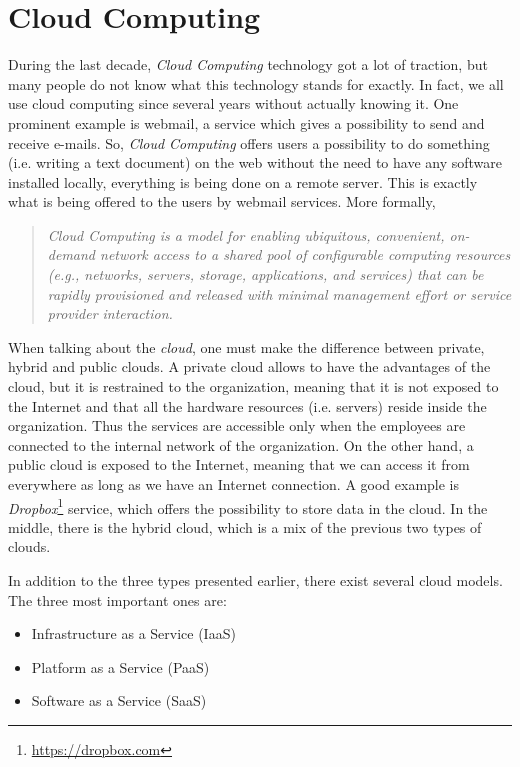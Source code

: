 

\chapter{Cloud Computing}
During the last decade, \textit{Cloud Computing} technology got a lot of traction, but many people do not know what this technology stands for exactly. 
In fact, we all use cloud computing since several years without actually knowing it. One prominent example is webmail, a service which gives a possibility to send and receive e-mails.
So, \textit{Cloud Computing} offers users a possibility to do something (i.e. writing a text document) on the web without the need to have any software installed locally, everything is being done on a remote server. 
This is exactly what is being offered to the users by webmail services.
More formally, 

\begin{quotation}
\textit{Cloud Computing is a model for enabling ubiquitous, convenient, on-demand network access to a shared pool of configurable computing resources (e.g., networks, servers, storage, applications, and services) that can be rapidly provisioned and released with minimal management effort or service provider interaction.} \cite{nist}
\end{quotation}

When talking about the \textit{cloud}, one must make the difference between private, hybrid and public clouds. 
A private cloud allows to have the advantages of the cloud, but it is restrained to the organization, meaning that it is not exposed to the Internet and that all the hardware resources (i.e. servers) reside inside the organization. 
Thus the services are accessible only when the employees are connected to the internal network of the organization. 
On the other hand, a public cloud is exposed to the Internet, meaning that we can access it from everywhere as long as we have an Internet connection. 
A good example is \textit{Dropbox}\footnote{\url{https://dropbox.com}} service, which offers the possibility to store data in the cloud. 
In the middle, there is the hybrid cloud, which is a mix of the previous two types of clouds.

In addition to the three types presented earlier, there exist several cloud models.
The three most important ones are: 

{
\singlespacing
\begin{itemize}
	\item Infrastructure as a Service (IaaS)
	\item Platform as a Service (PaaS)
	\item Software as a Service (SaaS)
\end{itemize}
}

